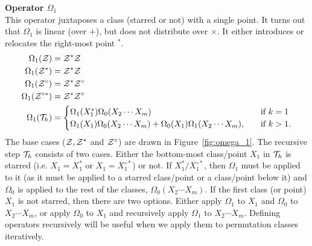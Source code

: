 \documentclass[12pt, a4paper, twoside]{report}
\begin{document}
\noindent\textbf{Operator $\Omega_1$}\\
This operator juxtaposes a class (starred or not) with a single point. It turns out that $\Omega_1$ is linear (over $+$), but does not distribute over $\times$. It either introduces or relocates the right-most point ${}^*$. 
\begin{align}
\begin{aligned}
    \Omega_1(\mathcal{Z}) &= \mathcal{Z}^*\mathcal{Z}\\
    \Omega_1(\mathcal{Z}^*) &= \mathcal{Z}^*\mathcal{Z}\\
    \Omega_1(\mathcal{Z}^\circ) &= \mathcal{Z}^*\mathcal{Z}^\circ\\
    \Omega_1(\mathcal{Z}^{\circ*}) &= \mathcal{Z}^*\mathcal{Z}^\circ\\
  \Omega_1(\mathcal{T}_h) &=
                      \begin{cases}
                        \Omega_1(X_1^*)\Omega_0(X_2\cdots X_m) \quad &\text{if $k = 1$}\\
                        \Omega_1(X_1)\Omega_0(X_2\cdots X_m) + \Omega_0(X_1)\Omega_1(X_2\cdots X_m),\quad &\text{if $k>1$.}
                      \end{cases}
\end{aligned}
\label{eq:omega1Cstar}
\end{align}
The base cases ($\mathcal{Z}, \mathcal{Z}^*$ and $\mathcal{Z}^\circ$) are drawn in Figure~\ref{fig:omega_1}. The recursive step $\mathcal{T}_h$ consists of two cases. Either the bottom-most class/point $X_1$ in $\mathcal{T}_h$ is starred (i.e. $X_1 = X_1^*$ or $X_1 = X_1^{\circ*}$) or not. If $X_1^*/X_1^{\circ*}$, then $\Omega_1$ must be applied to it (as it must be applied to a starred class/point or a class/point below it) and $\Omega_0$ is applied to the rest of the classes, $\Omega_0(X_2\cdots X_m)$. If the first class (or point) $X_1$ is not starred, then there are two options. Either apply $\Omega_1$ to $X_1$ and $\Omega_0$ to $X_2\cdots X_m$, or apply $\Omega_0$ to $X_1$ and recursively apply $\Omega_1$ to $X_2\cdots X_m$. Defining operators recursively will be useful when we apply them to permutation classes iteratively.
\end{document}
